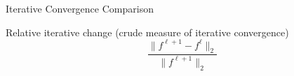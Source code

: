 \documentclass[10pt]{beamer}
\newcommand{\edd}{\langle \mu^2 \rangle}
\begin{document}
\begin{frame}{Iterative Convergence Comparison}

	Relative iterative change (crude measure of iterative convergence)
	\begin{equation*}
		\frac{\| f^{\ell+1} - f^\ell \|_2}{\| f^{\ell+1} \|_2}
	\end{equation*}

	\vspace{-.2in}

	\begin{columns}


\end{columns}
\end{frame}
\end{document}
